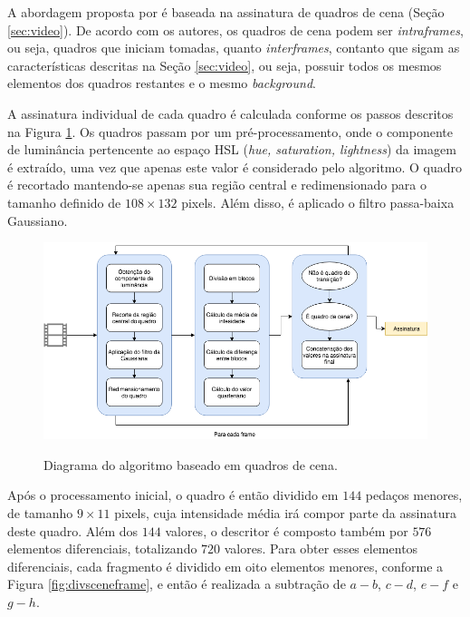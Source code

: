   A abordagem proposta por  é baseada na assinatura de quadros de cena (Seção \ref{sec:video}). De acordo com os autores, os quadros de cena podem ser \textit{intraframes}, ou seja, quadros que iniciam tomadas, quanto \textit{interframes}, contanto que sigam as características descritas na Seção \ref{sec:video}, ou seja, possuir todos os mesmos elementos dos quadros restantes e o mesmo \textit{background}.

A assinatura individual de cada quadro é calculada conforme os passos descritos na Figura \ref{fig:dia_sceneframe}. Os quadros passam por um pré-processamento, onde o componente de luminância pertencente ao espaço HSL (\textit{hue, saturation, lightness}) da imagem é extraído, uma vez que apenas este valor é considerado pelo algoritmo. O quadro é recortado mantendo-se apenas sua região central e redimensionado para o tamanho definido de $108\times132$ pixels. Além disso, é aplicado o filtro passa-baixa Gaussiano.

\begin{figure}[h]
  \centering
  \caption{Diagrama do algoritmo baseado em quadros de cena.}
  \includegraphics[width=\textwidth]{dados/figuras/diagramas/Diag-SceneFrame}
  \label{fig:dia_sceneframe}
\end{figure}

Após o processamento inicial, o quadro é então dividido em $144$ pedaços menores, de tamanho $9\times11$ pixels, cuja intensidade média irá compor parte da assinatura deste quadro. Além dos $144$ valores, o descritor é composto também por $576$ elementos diferenciais, totalizando $720$ valores. Para obter esses elementos diferenciais, cada fragmento é dividido em oito elementos menores, conforme a Figura \ref{fig:divsceneframe}, e então é realizada a subtração de $a - b$, $c - d$, $e - f$ e $g - h$.

